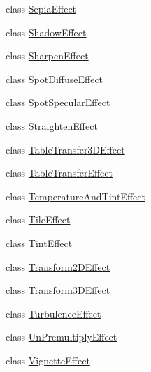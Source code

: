 \begin{DoxyCompactItemize}
\item 
class \hyperlink{class_microsoft_1_1_graphics_1_1_canvas_1_1_effects_1_1_sepia_effect}{Sepia\+Effect}
\item 
class \hyperlink{class_microsoft_1_1_graphics_1_1_canvas_1_1_effects_1_1_shadow_effect}{Shadow\+Effect}
\item 
class \hyperlink{class_microsoft_1_1_graphics_1_1_canvas_1_1_effects_1_1_sharpen_effect}{Sharpen\+Effect}
\item 
class \hyperlink{class_microsoft_1_1_graphics_1_1_canvas_1_1_effects_1_1_spot_diffuse_effect}{Spot\+Diffuse\+Effect}
\item 
class \hyperlink{class_microsoft_1_1_graphics_1_1_canvas_1_1_effects_1_1_spot_specular_effect}{Spot\+Specular\+Effect}
\item 
class \hyperlink{class_microsoft_1_1_graphics_1_1_canvas_1_1_effects_1_1_straighten_effect}{Straighten\+Effect}
\item 
class \hyperlink{class_microsoft_1_1_graphics_1_1_canvas_1_1_effects_1_1_table_transfer3_d_effect}{Table\+Transfer3\+D\+Effect}
\item 
class \hyperlink{class_microsoft_1_1_graphics_1_1_canvas_1_1_effects_1_1_table_transfer_effect}{Table\+Transfer\+Effect}
\item 
class \hyperlink{class_microsoft_1_1_graphics_1_1_canvas_1_1_effects_1_1_temperature_and_tint_effect}{Temperature\+And\+Tint\+Effect}
\item 
class \hyperlink{class_microsoft_1_1_graphics_1_1_canvas_1_1_effects_1_1_tile_effect}{Tile\+Effect}
\item 
class \hyperlink{class_microsoft_1_1_graphics_1_1_canvas_1_1_effects_1_1_tint_effect}{Tint\+Effect}
\item 
class \hyperlink{class_microsoft_1_1_graphics_1_1_canvas_1_1_effects_1_1_transform2_d_effect}{Transform2\+D\+Effect}
\item 
class \hyperlink{class_microsoft_1_1_graphics_1_1_canvas_1_1_effects_1_1_transform3_d_effect}{Transform3\+D\+Effect}
\item 
class \hyperlink{class_microsoft_1_1_graphics_1_1_canvas_1_1_effects_1_1_turbulence_effect}{Turbulence\+Effect}
\item 
class \hyperlink{class_microsoft_1_1_graphics_1_1_canvas_1_1_effects_1_1_un_premultiply_effect}{Un\+Premultiply\+Effect}
\item 
class \hyperlink{class_microsoft_1_1_graphics_1_1_canvas_1_1_effects_1_1_vignette_effect}{Vignette\+Effect}
\end{DoxyCompactItemize}
